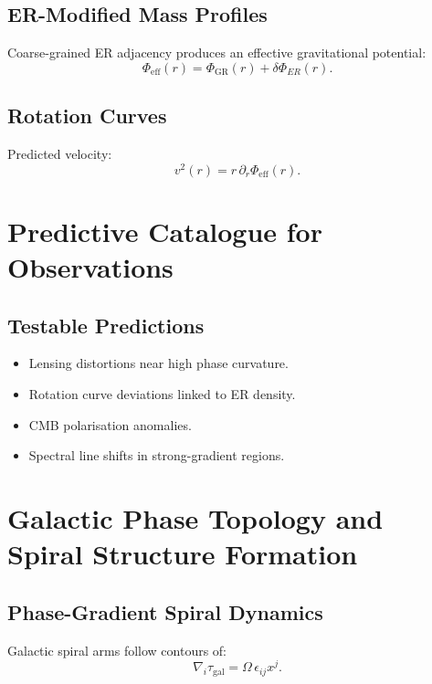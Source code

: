 \section{ER-Modified Mass Profiles}
Coarse-grained ER adjacency produces an effective gravitational potential:
\[
\Phi_{\mathrm{eff}}(r)=\Phi_{\mathrm{GR}}(r)+\delta\Phi_{ER}(r).
\]

\section{Rotation Curves}
Predicted velocity:
\[
v^2(r)=r\,\partial_r\Phi_{\mathrm{eff}}(r).
\]


\chapter{Predictive Catalogue for Observations}

\section{Testable Predictions}
\begin{itemize}
\item Lensing distortions near high phase curvature.
\item Rotation curve deviations linked to ER density.
\item CMB polarisation anomalies.
\item Spectral line shifts in strong-gradient regions.
\end{itemize}


\chapter{Galactic Phase Topology and Spiral Structure Formation}

\section{Phase-Gradient Spiral Dynamics}
Galactic spiral arms follow contours of:
\[
\nabla_i \tau_{\mathrm{gal}} = \Omega\, \epsilon_{ij} x^j.
\]

